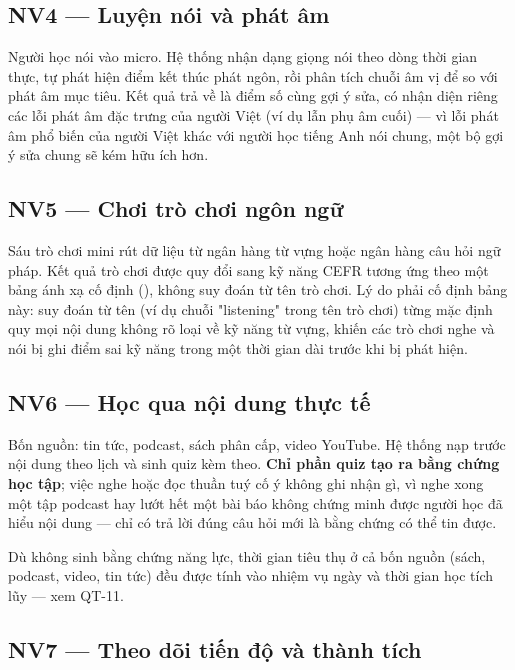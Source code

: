 \subsection{NV4 — Luyện nói và phát âm}

Người học nói vào micro. Hệ thống nhận dạng giọng nói theo dòng thời gian thực, tự phát
hiện điểm kết thúc phát ngôn, rồi phân tích chuỗi âm vị để so với phát âm mục tiêu. Kết quả
trả về là điểm số cùng gợi ý sửa, có nhận diện riêng các lỗi phát âm đặc trưng của người
Việt (ví dụ lẫn phụ âm cuối) — vì lỗi phát âm phổ biến của người Việt khác với người học
tiếng Anh nói chung, một bộ gợi ý sửa chung sẽ kém hữu ích hơn.

\subsection{NV5 — Chơi trò chơi ngôn ngữ}

Sáu trò chơi mini rút dữ liệu từ ngân hàng từ vựng hoặc ngân hàng câu hỏi ngữ pháp. Kết
quả trò chơi được quy đổi sang kỹ năng CEFR tương ứng theo một bảng ánh xạ cố định
(), không suy đoán từ tên trò chơi. Lý do phải cố định bảng này:
suy đoán từ tên (ví dụ chuỗi "listening" trong tên trò chơi) từng mặc định quy mọi nội
dung không rõ loại về kỹ năng từ vựng, khiến các trò chơi nghe và nói bị ghi điểm sai kỹ
năng trong một thời gian dài trước khi bị phát hiện.

\subsection{NV6 — Học qua nội dung thực tế}

Bốn nguồn: tin tức, podcast, sách phân cấp, video YouTube. Hệ thống nạp trước nội dung
theo lịch và sinh quiz kèm theo. \textbf{Chỉ phần quiz tạo ra bằng chứng học tập}; việc
nghe hoặc đọc thuần tuý cố ý không ghi nhận gì, vì nghe xong một tập podcast hay lướt hết
một bài báo không chứng minh được người học đã hiểu nội dung — chỉ có trả lời đúng câu hỏi
mới là bằng chứng có thể tin được.

Dù không sinh bằng chứng năng lực, thời gian tiêu thụ ở cả bốn nguồn (sách, podcast, video,
tin tức) đều được tính vào nhiệm vụ ngày và thời gian học tích lũy — xem QT-11.

\subsection{NV7 — Theo dõi tiến độ và thành tích}

